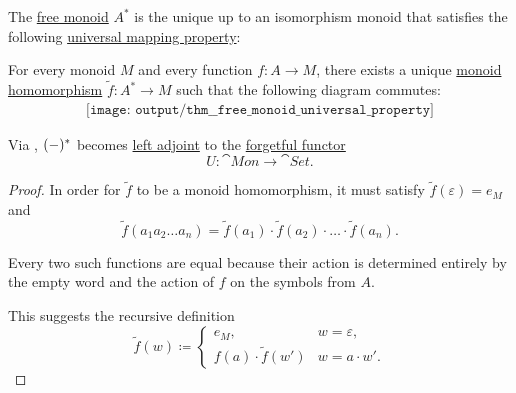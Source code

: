 \begin{theorem}\label{thm:free_monoid_universal_property}
  The \hyperref[def:free_monoid]{free monoid} \( A^* \) is the unique up to an isomorphism monoid that satisfies the following \hyperref[rem:universal_mapping_property]{universal mapping property}:
  \begin{displayquote}
    For every monoid \( M \) and every function \( f: A \to M \), there exists a unique \hyperref[def:monoid/homomorphism]{monoid homomorphism} \( \widetilde{f}: A^* \to M \) such that the following diagram commutes:
    \begin{equation}\label{eq:thm:free_monoid_universal_property/diagram}
      \begin{aligned}
        \texttt{[image: output/thm\_\_free\_monoid\_universal\_property]}
      \end{aligned}
    \end{equation}
  \end{displayquote}
\end{theorem}
\begin{comments}
  \item Via , \( (\Anon*)^* \) becomes \hyperref[def:category_adjunction]{left adjoint} to the \hyperref[def:concrete_category]{forgetful functor}
  \begin{equation*}
    U: \cat{Mon} \to \cat{Set}.
  \end{equation*}
\end{comments}
\begin{proof}
  In order for \( \widetilde{f} \) to be a monoid homomorphism, it must satisfy \( \widetilde{f}(\varepsilon) = e_M \) and
  \begin{equation*}
    \widetilde{f}(a_1 a_2 \ldots a_n) = \widetilde{f}(a_1) \cdot \widetilde{f}(a_2) \cdot \ldots \cdot \widetilde{f}(a_n).
  \end{equation*}

  Every two such functions are equal because their action is determined entirely by the empty word and the action of \( f \) on the symbols from \( A \).

  This suggests the recursive definition
  \begin{equation*}
    \widetilde{f}(w) \coloneqq \begin{cases}
      e_M,                         &w = \varepsilon, \\
      f(a) \cdot \widetilde{f}(w') &w = a \cdot w'.
    \end{cases}
  \end{equation*}
\end{proof}

